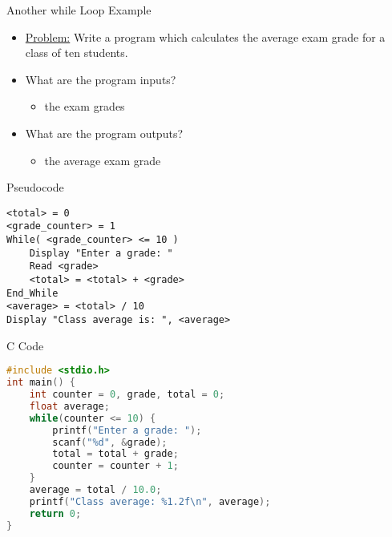 \documentclass[graphics]{beamer}
\begin{document}
\begin{frame}{Another while Loop Example}
    \begin{itemize}
        \item \underline{Problem:} Write a program which calculates the average exam grade for a class of ten students.
        \item What are the program inputs?
        \begin{itemize}
            \item the exam grades
        \end{itemize}
        \item What are the program outputs?
        \begin{itemize}
            \item the average exam grade
        \end{itemize}
    \end{itemize}
\end{frame}

\begin{frame}[fragile]{Pseudocode}
\begin{verbatim}
<total> = 0
<grade_counter> = 1
While( <grade_counter> <= 10 )
    Display "Enter a grade: "
    Read <grade>
    <total> = <total> + <grade>
End_While
<average> = <total> / 10
Display "Class average is: ", <average>
\end{verbatim}
\end{frame}

\begin{frame}[fragile]{C Code}
\begin{lstlisting}[language=C,basicstyle=\footnotesize,keywordstyle=\color{blue},commentstyle=\color{green},showstringspaces=false,stringstyle=\color{red}]
#include <stdio.h>
int main() {
    int counter = 0, grade, total = 0;
    float average;
    while(counter <= 10) {
        printf("Enter a grade: ");
        scanf("%d", &grade);
        total = total + grade;
        counter = counter + 1;
    }
    average = total / 10.0;
    printf("Class average: %1.2f\n", average);
    return 0;
}
\end{lstlisting}
\end{frame}
\end{document}

